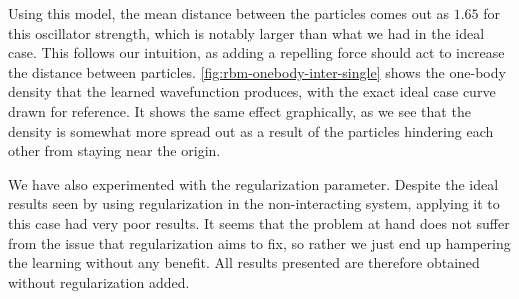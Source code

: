 \documentclass[a4paper, 11pt]{article}
\begin{document}
\begin{multicols}{2}
    Using this model, the mean distance between the particles comes out as
    $1.65$ for this oscillator strength, which is notably larger than what we
    had in the ideal case. This follows our intuition, as adding a repelling
    force should act to increase the distance between particles.
    \autoref{fig:rbm-onebody-inter-single} shows the one-body density that the learned
    wavefunction produces, with the exact ideal case curve drawn for reference.
    It shows the same effect graphically, as we see that the density is somewhat
    more spread out as a result of the particles hindering each other from
    staying near the origin.

    We have also experimented with the regularization parameter. Despite the
    ideal results seen by using regularization in the non-interacting system,
    applying it to this case had very poor results. It seems that the problem at
    hand does not suffer from the issue that regularization aims to fix, so
    rather we just end up hampering the learning without any benefit. All
    results presented are therefore obtained without regularization added.

\end{multicols}
\end{document}
